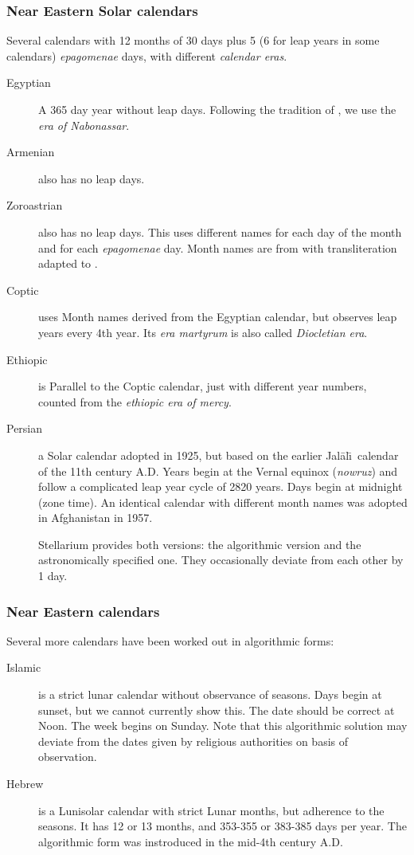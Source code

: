 \subsubsection{Near Eastern Solar calendars}
Several calendars with 12 months of 30 days plus 5 (6 for leap years
in some calendars) \emph{epagomenae} days, with different \emph{calendar eras}.
\begin{description}
\item[Egyptian] A 365 day year without leap days. Following the
  tradition of , we use the \emph{era of Nabonassar}.
\item[Armenian] also has no leap days.
\item[Zoroastrian] also has no leap days. This uses different names
  for each day of the month and for each \emph{epagomenae} day. Month
  names are from \citet[\S69]{Ginzel:ChronologieI} with
  transliteration adapted to \citet{Reingold-Dershowitz:2018}.
\item[Coptic] uses Month names derived from the Egyptian calendar, but observes
  leap years every 4th year. Its \emph{era martyrum} is also called
  \emph{Diocletian era}.
\item[Ethiopic] is Parallel to the Coptic calendar, just with different
  year numbers, counted from the \emph{ethiopic era of mercy}.
\item[Persian] a Solar calendar adopted in 1925, 
  but based on the earlier Jal\=al\=\i\ calendar of the 11th century
  A.D. Years begin at the Vernal equinox (\emph{nowruz}) and follow a
  complicated leap year cycle of 2820 years. Days begin at midnight
  (zone time). An identical calendar with different month names was
  adopted in Afghanistan in 1957.

  Stellarium provides both versions: the algorithmic version and the
  astronomically specified one. They occasionally deviate from each
  other by 1 day.
\end{description}

\subsubsection{Near Eastern calendars}
Several more calendars  have been worked out in algorithmic forms:
\begin{description}
\item[Islamic] is a strict lunar calendar without observance of
  seasons. Days begin at sunset, but we cannot currently show
  this. The date should be correct at Noon. The week begins on
  Sunday. Note that this algorithmic solution may deviate from the
  dates given by religious authorities on basis of observation.
\item[Hebrew] is a Lunisolar calendar with strict Lunar months, but
  adherence to the seasons. It has 12 or 13 months, and 353-355 or
  383-385 days per year. The algorithmic form was instroduced in the
  mid-4th century A.D.
\end{description}



